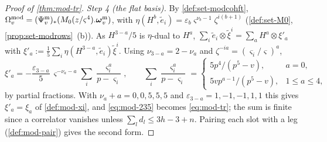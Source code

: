 \begin{proof}[Proof of \cref{thm:mod-tr}]
\emph{Step 4 (the flat basis).} By \cref{def:set-modcohft}, $\Omega^{\mathrm{mod}}_v=(\Psi^{\mathrm m}_v)_*(M_{0}(z/\varsigma^4).\boldsymbol{\omega}^{\mathrm m}_v)$, with $\eta(H^b,\tilde e_i)=\varepsilon_b\varsigma^{\nu_b-1}\zeta^{i(b+1)}$ (\cref{def:set-M0}, \cref{prop:set-modrows}~(b)). As $H^{3-a}/5$ is $\eta$-dual to $H^a$, $\sum_i\tilde e_i\otimes\tilde\xi^i=\sum_aH^a\otimes\xi'_a$ with $\xi'_a:=\frac15\sum_i\eta(H^{3-a},\tilde e_i)\tilde\xi^i$. Using $\nu_{3-a}=2-\nu_a$ and $\zeta^{-ia}=(\varsigma_i/\varsigma)^a$,
\[
\xi'_a=-\frac{\varepsilon_{3-a}}{5}\,\varsigma^{-\nu_a-a}\sum_i\frac{\varsigma_i^a}{p-\varsigma_i},\qquad\sum_i\frac{\varsigma_i^a}{p-\varsigma_i}=\begin{cases}5p^4/(p^5-v),&a=0,\\ 5vp^{a-1}/(p^5-v),&1\leq a\leq 4,\end{cases}
\]
by partial fractions. With $\nu_a+a=0,0,5,5,5$ and $\varepsilon_{3-a}=1,-1,-1,1,1$ this gives $\xi'_a=\xi_a$ of \cref{def:mod-xi}, and \eqref{eq:mod-235} becomes \eqref{eq:mod-tr}; the sum is finite since a correlator vanishes unless $\sum_ld_l\leq 3h-3+n$. Pairing each slot with a leg (\cref{def:mod-pair}) gives the second form.
\end{proof}


